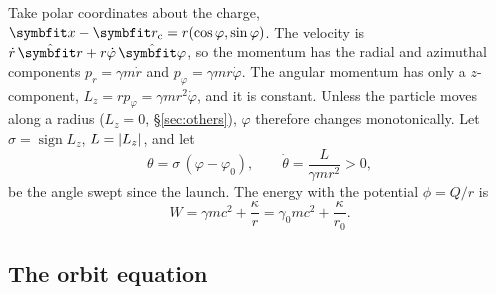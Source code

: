 \documentclass{leveldoc}
\begin{document}
Take polar coordinates about the charge, $\vect{x} - \vect{r}_\mathrm{c} = r(\cos\varphi, \sin\varphi)$.
The velocity is $\dot r\,\uvec{r} + r\dot\varphi\,\uvec{\varphi}$, so the momentum has the
radial and azimuthal components $p_r = \gamma m\dot r$ and $p_\varphi = \gamma m r\dot\varphi$.
The angular momentum  has only a $z$-component,
$L_z = r p_\varphi = \gamma m r^2\dot\varphi$, and it is constant. Unless the particle moves
along a radius ($L_z = 0$, §\ref{sec:others}), $\varphi$ therefore changes monotonically. Let
$\sigma = \operatorname{sign} L_z$, $L = \left\lvert L_z\right\rvert$, and let
\begin{equation}\label{eq:theta}
  \theta = \sigma\,(\varphi - \varphi_0), \qquad \dot\theta = \frac{L}{\gamma m r^2} > 0,
\end{equation}
be the angle swept since the launch. The energy  with the
potential $\phi = Q/r$ is
\begin{equation}\label{eq:energy}
  W = \gamma mc^2 + \frac{\kappa}{r} = \gamma_0 mc^2 + \frac{\kappa}{r_0}.
\end{equation}

\subsection{The orbit equation}
\end{document}

